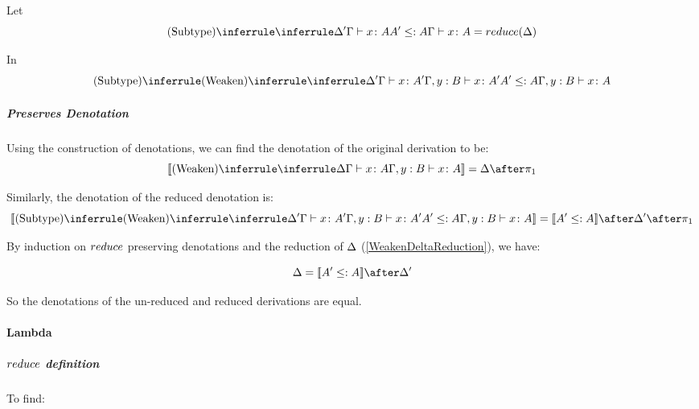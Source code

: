 {        Let 
        \begin{equation}\label{WeakenDeltaReduction}
            \ntreeruleII{Subtype}{\treeruleI{\D'}{\gtyperelation{x}{A}}}{ A'\subtype A}{\gtyperelation{x}{A}} = \reduce(\D)
        \end{equation}

        In 
        \begin{equation}
            \ntreeruleII{Subtype}{
            \ntreeruleI{Weaken}{
                \treeruleI{\D'}{\gtyperelation{x}{A'}}
            } {
                \typerelation{\gby}{x}{A'}
            }
            }{
            A' \subtype A
            }{\typerelation{\gby}{x}{A}}
        \end{equation}

        \subparagraph{Preserves Denotation}
        Using the construction of denotations, we can find the denotation of the original derivation to be:
        \begin{equation}
            \deno{\ntreeruleI{Weaken}{\treeruleI{\D}{\gtyperelation{x}{A}}}{\typerelation{\gby}{x}{A}}} = \D \after \p
        \end{equation}

        Similarly, the denotation of the reduced denotation is:
        \begin{equation}
            \deno{\ntreeruleII{Subtype}{
                \ntreeruleI{Weaken}{
                    \treeruleI{\D'}{\gtyperelation{x}{A'}}
                } {
                    \typerelation{\gby}{x}{A'}
                }
                }{
                A' \subtype A
                }{\typerelation{\gby}{x}{A}}} = \deno{A'\subtype A}\after \D' \after \p
        \end{equation}


        By induction on $reduce$ preserving denotations and the reduction of $\Delta$ (\ref{WeakenDeltaReduction}), we have:

        \begin{equation}
            \D = \deno{A' \subtype A}\after\D'
        \end{equation}

        So the denotations of the un-reduced and reduced derivations are equal.

        \paragraph{Lambda}
        \subparagraph{$reduce$ definition}
            To find:
        
}
